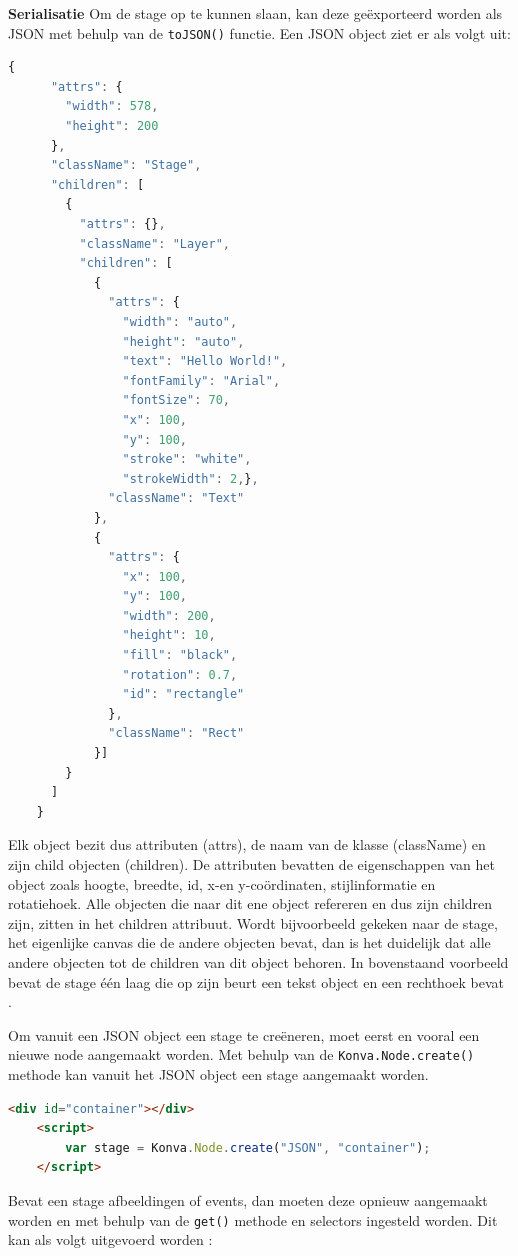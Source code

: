 \textbf{Serialisatie} \break
Om de stage op te kunnen slaan, kan deze ge\"{e}xporteerd worden als JSON met behulp van de \lstinline{toJSON()} functie. Een JSON object ziet er als volgt uit:

\begin{lstlisting}[language=javascript]
	{
	  "attrs": {
	    "width": 578,
	    "height": 200
	  },
	  "className": "Stage",
	  "children": [
	    {
	      "attrs": {},
	      "className": "Layer",
	      "children": [
	        {
	          "attrs": {
	            "width": "auto",
	            "height": "auto",
	            "text": "Hello World!",
	            "fontFamily": "Arial",
	            "fontSize": 70,
	            "x": 100,
	            "y": 100,
	            "stroke": "white",
	            "strokeWidth": 2,},
	          "className": "Text"
	        },
	        {
	          "attrs": {
	            "x": 100,
	            "y": 100,
	            "width": 200,
	            "height": 10,
	            "fill": "black",
	            "rotation": 0.7,
	            "id": "rectangle"
	          },
	          "className": "Rect"
	        }]
	    }
	  ]
	}
\end{lstlisting}

Elk object bezit dus attributen (attrs), de naam van de klasse (className) en zijn child objecten (children).  De attributen bevatten de eigenschappen van het object zoals hoogte, breedte, id, x-en y-co\"{o}rdinaten, stijlinformatie en rotatiehoek. Alle objecten die naar dit ene object refereren en dus zijn children zijn, zitten in het children attribuut. Wordt bijvoorbeeld gekeken naar de stage, het eigenlijke canvas die de andere objecten bevat, dan is het duidelijk dat alle andere objecten tot de children van dit object behoren. In bovenstaand voorbeeld bevat de stage \'{e}\'{e}n laag die op zijn beurt een tekst object en een rechthoek bevat \cite{KonvaSerialize}. %

Om vanuit een JSON object een stage te cre\"{e}neren, moet eerst en vooral een nieuwe node aangemaakt worden. Met behulp van de \lstinline{Konva.Node.create()} methode kan vanuit het JSON object een stage aangemaakt worden. 
\begin{lstlisting}[language=HTML]
	<div id="container"></div>
	<script>
		var stage = Konva.Node.create("JSON", "container");
	</script>
\end{lstlisting}

Bevat een stage afbeeldingen of events, dan moeten deze opnieuw aangemaakt worden en met behulp van de \lstinline{get()} methode en selectors ingesteld worden. Dit kan als volgt uitgevoerd worden \cite{KonvaLoad}:

